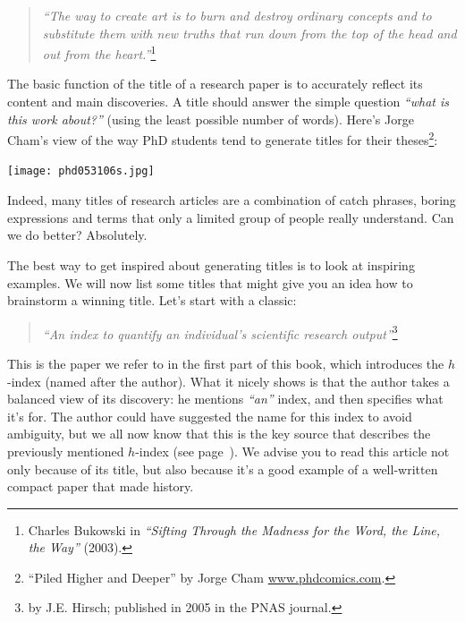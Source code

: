 \documentclass[graybox,envcountchap,sectrefs,UStrade]{svmono}
\begin{document}
\begin{quote}
    \emph{``The way to create art is to burn and destroy ordinary concepts and to substitute them with new truths that run down from the top of the head and out from the heart.''}\footnote{Charles Bukowski in \emph{``Sifting Through the Madness for the Word, the Line, the Way''} (2003).}
\end{quote}

The basic function of the title of a research paper is to accurately reflect its content and main discoveries. A title should answer the simple question \emph{``what is this work about?''} (using the least possible number of words). Here's Jorge Cham's view of the way PhD students tend to generate titles for their theses\footnote{``Piled Higher and Deeper'' by Jorge Cham \url{www.phdcomics.com}.}:\par

\medskip
\begin{center}
  \texttt{[image: phd053106s.jpg]}
\end{center}

Indeed, many titles of research articles are a combination of catch phrases, boring expressions and terms that only a limited group of people really understand. Can we do better? Absolutely.\par

The best way to get inspired about generating titles is to look at inspiring examples. We will now list some titles that might give you an idea how to brainstorm a winning title. Let's start with a classic:

\begin{quote}
    \emph{``An index to quantify an individual's scientific research output''}\footnote{by J.E. Hirsch; published in 2005 in the PNAS journal.}
\end{quote}

This is the paper we refer to in the first part of this book, which introduces the $h$-index (named after the author). What it nicely shows is that the author takes a balanced view of its discovery: he mentions \emph{``an''} index, and then specifies what it's for. The author could have suggested the name for this index to avoid ambiguity, but we all now know that this is the key source that describes the previously mentioned $h$-index (see page~\pageref{Fig:citations_h_index}). We advise you to read this article not only because of its title, but also because it's a good example of a well-written compact paper that made history. \par
\end{document}
